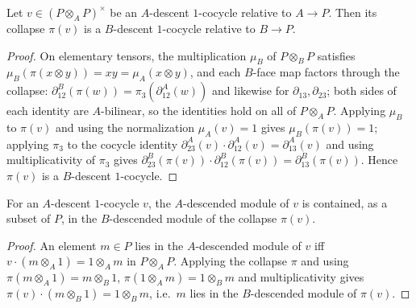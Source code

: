 \begin{theorem}
  \label{thm:module_descentCocycle_collapse}
  \leanok
  Let \(v \in (P \otimes_A P)^{\times}\) be an \(A\)-descent \(1\)-cocycle relative to \(A \to
  P\).  Then its collapse \(\pi(v)\) is a \(B\)-descent \(1\)-cocycle relative to \(B \to P\).
\end{theorem}
\begin{proof}
  \leanok
  On elementary tensors, the multiplication \(\mu_B\) of \(P \otimes_B P\) satisfies \(\mu_B(\pi(x
  \otimes y)) = xy = \mu_A(x \otimes y)\), and each \(B\)-face map factors through the collapse:
  \(\partial^B_{12}(\pi(w)) = \pi_3(\partial^A_{12}(w))\) and likewise for \(\partial_{13},
  \partial_{23}\); both sides of each identity are \(A\)-bilinear, so the identities hold on all
  of \(P \otimes_A P\).  Applying \(\mu_B\) to \(\pi(v)\) and using the normalization
  \(\mu_A(v) = 1\) gives \(\mu_B(\pi(v)) = 1\); applying \(\pi_3\) to the cocycle identity
  \(\partial^A_{23}(v) \cdot \partial^A_{12}(v) = \partial^A_{13}(v)\) and using
  multiplicativity of \(\pi_3\) gives \(\partial^B_{23}(\pi(v)) \cdot \partial^B_{12}(\pi(v)) =
  \partial^B_{13}(\pi(v))\).  Hence \(\pi(v)\) is a \(B\)-descent \(1\)-cocycle.
\end{proof}

\begin{lemma}
  \label{lem:module_descended_le_collapse}
  \leanok
  For an \(A\)-descent \(1\)-cocycle \(v\), the \(A\)-descended module of \(v\) is contained,
  as a subset of \(P\), in the \(B\)-descended module of the collapse \(\pi(v)\).
\end{lemma}
\begin{proof}
  \leanok
  An element \(m \in P\) lies in the \(A\)-descended module of \(v\) iff \(v \cdot (m \otimes_A
  1) = 1 \otimes_A m\) in \(P \otimes_A P\).  Applying the collapse \(\pi\) and using
  \(\pi(m \otimes_A 1) = m \otimes_B 1\), \(\pi(1 \otimes_A m) = 1 \otimes_B m\) and
  multiplicativity gives \(\pi(v) \cdot (m \otimes_B 1) = 1 \otimes_B m\), i.e.\ \(m\) lies in
  the \(B\)-descended module of \(\pi(v)\).
\end{proof}

